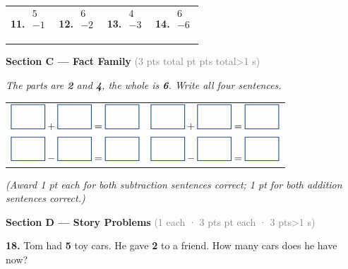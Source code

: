 \documentclass[12pt, letterpaper]{article}
\newcommand{\numbox}{\tikz{\draw[scholablue,thick](0,0)rectangle(1.2cm,0.85cm);}}
\newcommand{\pts}[1]{\textcolor{gray}{\small(#1 pt\ifnum#1>1 s\fi)}}
\begin{document}
\noindent
\begin{tabular}{@{}p{2.0cm} p{2.0cm} p{2.0cm} p{2.0cm}@{}}
\textbf{11.}
$\begin{array}{r} 5 \\ -1 \\ \hline \phantom{0} \end{array}$
&
\textbf{12.}
$\begin{array}{r} 6 \\ -2 \\ \hline \phantom{0} \end{array}$
&
\textbf{13.}
$\begin{array}{r} 4 \\ -3 \\ \hline \phantom{0} \end{array}$
&
\textbf{14.}
$\begin{array}{r} 6 \\ -6 \\ \hline \phantom{0} \end{array}$
\end{tabular}

\bigskip\bigskip

\noindent\textcolor{scholared}{\large\textbf{Section C — Fact Family}} \hfill \pts{3 pts total}

\medskip
\noindent\textit{The parts are \textbf{2} and \textbf{4}, the whole is \textbf{6}. Write all four sentences.}

\bigskip

\noindent\hspace{2em}
\begin{tabular}{@{}p{5.5cm} p{5.5cm}@{}}
$\numbox + \numbox = \numbox$ & $\numbox + \numbox = \numbox$ \\[10pt]
$\numbox - \numbox = \numbox$ & $\numbox - \numbox = \numbox$
\end{tabular}

\noindent\textit{\small (Award 1 pt each for both subtraction sentences correct; 1 pt for both addition sentences correct.)}

\bigskip\bigskip

\noindent\textcolor{scholared}{\large\textbf{Section D — Story Problems}} \hfill \pts{1 each · 3 pts}

\medskip

\noindent\textbf{18.} Tom had \textbf{5} toy cars. He gave \textbf{2} to a friend. How many cars does he have now?
\end{document}
